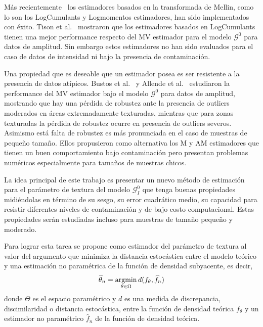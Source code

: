 Más recientemente~\cite{MellinAnalysisPolSAR,BujorTrouveValetNicolas2004,khan2014} los estimadores basados en la transformada de Mellin, como lo son los LogCumulants y Logmomentos estimadores, han sido implementados con éxito. Tison et al.~\cite{Tison2004} mostraron que los estimadores basados en LogCumulants tienen una mejor performance respecto del MV estimador para el modelo $\mathcal G^0$ para datos de amplitud. Sin embargo estos estimadores no han sido evaluados para el caso de datos de intensidad ni bajo la presencia de contaminación.

Una propiedad que es deseable que un estimador posea es ser resistente a la presencia de datos atípicos. Bustos et al.~\cite{BustosFreryLucini:Mestimators:2001} y Allende et al.~\cite{AllendeFreryetal:JSCS:05} estudiaron la performance del MV estimador bajo el modelo $\mathcal{G}^{0}$ para datos de amplitud, mostrando que hay una pérdida de robustez ante la presencia de outliers moderados en áreas extremadamente texturadas, mientras que para zonas texturadas la pérdida de robustez ocurre en presencia de outliers severos. Asimismo está falta de robustez es más pronunciada en el caso de muestras de pequeño tamaño. Ellos propusieron como alternativa los M y AM estimadores que tienen un buen comportamiento bajo contaminación pero presentan problemas numéricos especialmente para tamaños de muestras chicos.

La idea principal de este trabajo es presentar un nuevo método de estimación para el parámetro de textura del modelo $\mathcal{G}_I^0$ que tenga  buenas propiedades midiéndolas en término de su sesgo, su error cuadrático medio, su capacidad para resistir diferentes niveles de contaminación y de bajo costo computacional. Estas propiedades serán estudiadas incluso para muestras de tamaño pequeño y moderado. 

Para lograr esta tarea se propone como estimador del parámetro de textura al valor del argumento que minimiza la distancia estocástica entre el modelo teórico y una estimación no paramétrica de la función de densidad subyacente, es decir,
\begin{align}
\widehat{\theta}_n=\mathop{\rm argmin} \limits_{\theta\in\Omega} d(f_{\theta}, \widehat{f}_n)
\end{align}
donde $\Theta$ es el espacio paramétrico y $d$ es una medida de discrepancia, discimilaridad o distancia estocástica, entre la función de densidad teórica $f_{\theta}$ y un estimador no paramétrico $\widehat{f}_n$ de la función de densidad teórica.

